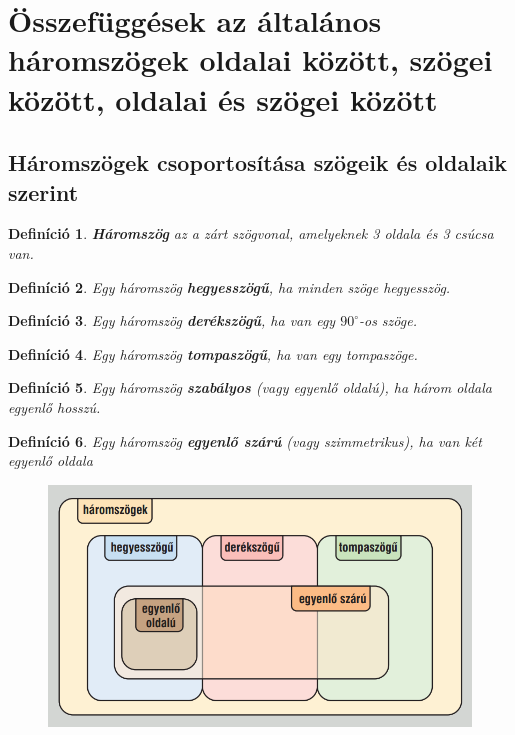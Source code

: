 \documentclass[12pt,a4paper]{article}
\newtheorem{definition}{Definíció} [section]
\begin{document}
\section{Összefüggések az általános háromszögek oldalai között, szögei között, oldalai és szögei között}

\subsection{Háromszögek csoportosítása szögeik és oldalaik szerint}

\begin{definition}
\textbf{Háromszög} az a zárt szögvonal, amelyeknek 3 oldala és 3 csúcsa van.
\end{definition}

\begin{definition}
Egy háromszög \textbf{hegyesszögű}, ha minden szöge hegyesszög.
\end{definition}

\begin{definition}
Egy háromszög \textbf{derékszögű}, ha van egy $90^\circ$-os szöge.
\end{definition}

\begin{definition}
Egy háromszög \textbf{tompaszögű}, ha van egy tompaszöge.
\end{definition}

\begin{definition}
Egy háromszög \textbf{szabályos} (vagy egyenlő oldalú), ha három oldala egyenlő hosszú.
\end{definition}

\begin{definition}
Egy háromszög \textbf{egyenlő szárú} (vagy szimmetrikus), ha van két egyenlő oldala
\end{definition}

\begin{figure} [h]
\centering
\includegraphics[scale=0.3]{geometry/haromszogek_csop}
\end{figure}
\end{document}

